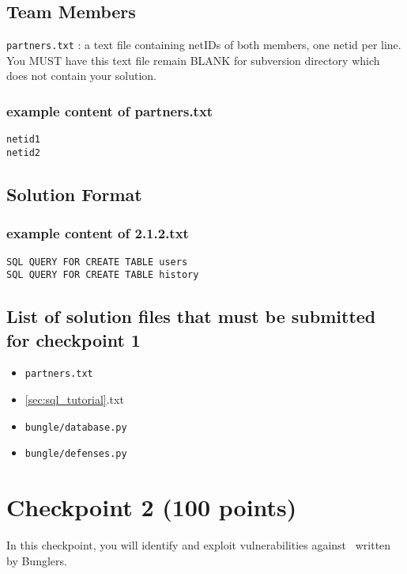 \documentclass[letterpaper,12pt]{report}
\begin{document}
\subsection*{Team Members}
\texttt{partners.txt} : a text file containing netIDs of both members, one netid per line. You MUST have this text file remain BLANK for subversion directory which does not contain your solution.

\subsubsection*{example content of partners.txt}
\begin{mdframed}
\begin{Verbatim}
netid1 
netid2
\end{Verbatim}
\end{mdframed}

\subsection*{Solution Format}

\subsubsection*{example content of 2.1.2.txt}
\begin{mdframed}
\begin{Verbatim}
SQL QUERY FOR CREATE TABLE users
SQL QUERY FOR CREATE TABLE history
\end{Verbatim}
\end{mdframed}

\pagebreak

\subsection*{List of solution files that must be submitted for checkpoint 1}

\begin{itemize}
\item {\tt partners.txt}
\item \ref{sec:sql_tutorial}.txt
\item {\tt bungle/database.py}
\item {\tt bungle/defenses.py}
\end{itemize}

\pagebreak


\section{Checkpoint 2 (100 points)}
\label{sec:checkpoint_2}
In this checkpoint, you will identify and exploit vulnerabilities against \bungle\ written by Bunglers. 
\end{document}

